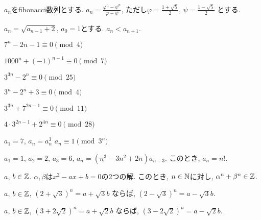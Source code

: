 \begin{prop}
  $a_n$をfibonacci数列とする.
  $a_n=\frac{\varphi^n-\psi^n}{\varphi-\psi}$,
  ただし$\varphi=\frac{1+\sqrt{5}}{2}$,
  $\psi=\frac{1-\sqrt{5}}{2}$
  とする.
\end{prop}

\begin{prop}
  $a_n=\sqrt{a_{n-1}+2}$, $a_0=1$とする.
  $a_n<a_{n+1}$.
\end{prop}


\begin{prop}
  $7^n-2n-1\equiv 0\pmod{4}$
\end{prop}

\begin{prop}
  $1000^n+(-1)^{n-1}\equiv 0\pmod{7}$
\end{prop}

\begin{prop}
  $3^{3n}-2^n\equiv 0\pmod{25}$
\end{prop}

\begin{prop}
  $3^{n}-2^n+3\equiv 0\pmod{4}$
\end{prop}

\begin{prop}
  $3^{3n}+7^{2n-1}\equiv 0\pmod{11}$
\end{prop}

\begin{prop}
  $4\cdot 3^{2n-1}+2^{4n}\equiv 0\pmod{28}$
\end{prop}

\begin{prop}
  $a_1=7$, $a_{n}=a_{n}^3$
  $a_n\equiv 1\pmod{3^n}$
\end{prop}

\begin{prop}
  $a_1=1$, $a_2=2$, $a_3=6$,
  $a_n=(n^3-3n^2+2n)a_{n-3}$.
  このとき, $a_n=n!$.
\end{prop}



\begin{prop}
  $a$, $b\in\mathbb{Z}$.
  $\alpha, \beta$は$x^2-ax+b=0$の2つの解.
  このとき, $n\in\mathbb{N}$に対し,
  $\alpha^n+\beta^n\in \mathbb{Z}$.
\end{prop}

\begin{prop}
  $a$, $b\in\mathbb{Z}$,  
  $(2+\sqrt{3})^n=a+\sqrt{3}b$
  ならば,
  $(2-\sqrt{3})^n=a-\sqrt{3}b$.
\end{prop}

\begin{prop}
  $a$, $b\in\mathbb{Z}$,  
  $(3+2\sqrt{2})^n=a+\sqrt{2}b$
  ならば,
  $(3-2\sqrt{2})^n=a-\sqrt{2}b$.
\end{prop}



